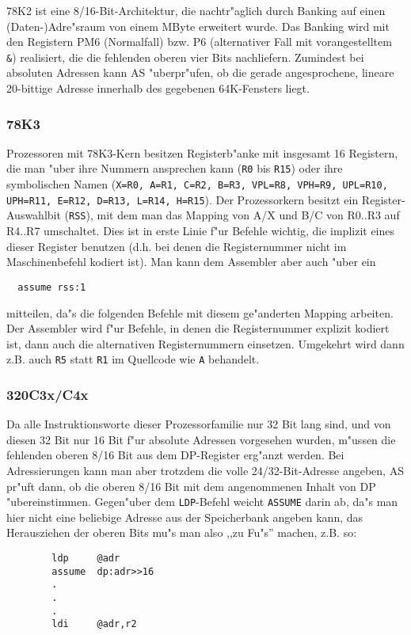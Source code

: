 \documentclass[12pt,a4paper,twoside]{report}
\newcommand{\tty}[1]{{\tt #1}}
\begin{document}
{78K2 ist eine 8/16-Bit-Architektur, die nachtr"aglich durch Banking auf
einen (Daten-)Adre"sraum von einem MByte erweitert wurde.  Das Banking
wird mit den Registern PM6 (Normalfall) bzw. P6 (alternativer Fall mit
vorangestelltem \verb!&!) realisiert, die die fehlenden oberen vier Bits 
nachliefern.  Zumindest bei absoluten Adressen kann AS "uberpr"ufen, ob
die gerade angesprochene, lineare 20-bittige Adresse innerhalb des
gegebenen 64K-Fensters liegt.   


\subsubsection{78K3}

Prozessoren mit 78K3-Kern besitzen Registerb"anke mit insgesamt 16 Registern,
die man "uber ihre Nummern ansprechen kann (\tty{R0} bis \tty{R15}) oder ihre symbolischen
Namen (\tty{X=R0, A=R1, C=R2, B=R3, VPL=R8, VPH=R9, UPL=R10, UPH=R11, E=R12,
D=R13, L=R14, H=R15}).  Der Prozessorkern besitzt ein Register-Auswahlbit
(\tty{RSS}), mit dem man das Mapping von A/X und B/C von R0..R3 auf R4..R7
umschaltet.  Dies ist in erste Linie f"ur Befehle wichtig, die implizit eines
dieser Register benutzen (d.h. bei denen die Registernummer nicht im Maschinenbefehl
kodiert ist).  Man kann dem Assembler aber auch "uber ein

\begin{verbatim}
  assume rss:1
\end{verbatim}

mitteilen, da"s die folgenden Befehle mit diesem ge"anderten Mapping arbeiten.  Der
Assembler wird f"ur Befehle, in denen die Registernummer explizit kodiert ist, dann
auch die alternativen Registernummern einsetzen.  Umgekehrt wird dann z.B. auch
\tty{R5} statt \tty{R1} im Quellcode wie \tty{A} behandelt.


\subsubsection{320C3x/C4x}

Da alle Instruktionsworte dieser Prozessorfamilie nur 32 Bit lang
sind, und von diesen 32 Bit nur 16 Bit f"ur absolute Adressen vorgesehen
wurden, m"ussen die fehlenden oberen 8/16 Bit aus dem DP-Register
erg"anzt werden.  Bei Adressierungen kann man aber trotzdem die volle
24/32-Bit-Adresse angeben, AS pr"uft dann, ob die oberen 8/16 Bit mit dem
angenommenen Inhalt von DP "ubereinstimmen.  Gegen"uber dem \tty{LDP}-Befehl
weicht \tty{ASSUME} darin ab, da"s man hier nicht eine beliebige Adresse
aus der Speicherbank angeben kann, das Herausziehen der oberen Bits
mu"s man also ,,zu Fu"s'' machen, z.B. so:
\begin{verbatim}
        ldp     @adr
        assume  dp:adr>>16
        .
        .
        .
        ldi     @adr,r2
\end{verbatim}

}
\end{document}
